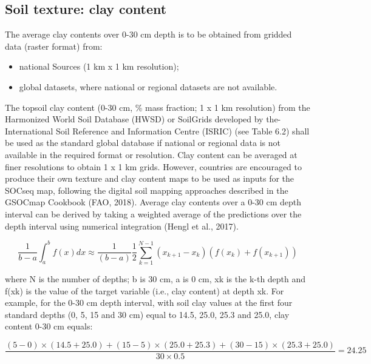 \documentclass[
  10pt,
  b5paper,
]{book}
\providecommand{\tightlist}{%
  \setlength{\itemsep}{0pt}\setlength{\parskip}{0pt}}
\begin{document}
\hypertarget{soil-texture-clay-content}{%
\subsection{Soil texture: clay content}\label{soil-texture-clay-content}}

The average clay contents over 0-30 cm depth is to be obtained from gridded data (raster format) from:

\begin{itemize}
\tightlist
\item
  national Sources (1 km x 1 km resolution);
\item
  global datasets, where national or regional datasets are not available.
\end{itemize}

The topsoil clay content (0-30 cm, \% mass fraction; 1 x 1 km resolution) from the Harmonized World Soil Database (HWSD) or SoilGrids developed by the- International Soil Reference and Information Centre (ISRIC) (see Table 6.2) shall be used as the standard global database if national or regional data is not available in the required format or resolution. Clay content can be averaged at finer resolutions to obtain 1 x 1 km grids. However, countries are encouraged to produce their own texture and clay content maps to be used as inputs for the SOCseq map, following the digital soil mapping approaches described in the GSOCmap Cookbook (FAO, 2018).
Average clay contents over a 0-30 cm depth interval can be derived by taking a weighted average of the predictions over the depth interval using numerical integration (Hengl et al., 2017).

\begin{equation}
\tag{6.1}
\frac{1}{b-a} \int_{a}^{b} f(x) dx \approx \frac{1}{(b-a)} \frac{1}{2} \sum_{k=1}^{N-1}(x_{k+1} - x_{k})(f(x_{k}) + f(x_{k +1})) 
\end{equation}

where N is the number of depths; b is 30 cm, a is 0 cm, xk is the k-th depth and f(xk) is the value of the target variable (i.e., clay content) at depth xk. For example, for the 0-30 cm depth interval, with soil clay values at the first four standard depths (0, 5, 15 and 30 cm) equal to 14.5, 25.0, 25.3 and 25.0, clay content 0-30 cm equals:

\begin{equation}
\tag{6.2}
	\frac{(5-0) \times(14.5+25.0)+(15-5) \times(25.0 + 25.3) + (30 - 15) \times (25.3 + 25.0)} {30\times 0.5} = 24.25
\end{equation}
\end{document}

